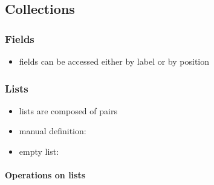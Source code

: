 \documentclass[a4paper,landscape,10pt]{article}
\begin{document}
\begin{multicols*}{2}
  \subsection{Collections}

  \subsubsection{Fields}

  \begin{itemize}
    \item fields can be accessed either by label or by position
  \end{itemize}

  \subsubsection{Lists}

  \begin{itemize}
    \item lists are composed of pairs
    \item manual definition: \ihaskell{[1, 2, 3]}
    \item empty list: \ihaskell{[]}
  \end{itemize}

  \paragraph{Operations on lists}

  \begin{itemize}


\end{itemize}
\end{multicols*}
\end{document}
